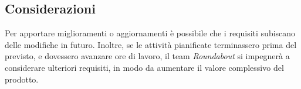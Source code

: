 \subsection{Considerazioni}
Per apportare miglioramenti o aggiornamenti è possibile che i requisiti subiscano delle modifiche in futuro. Inoltre, se le attività pianificate terminassero prima del previsto, e dovessero avanzare ore di lavoro, il team \textit{Roundabout} si impegnerà a considerare ulteriori requisiti, in modo da aumentare il valore complessivo del prodotto. 